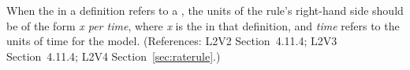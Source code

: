 When the  in a \RateRule definition refers to a \Parameter,
the units of the rule's right-hand side should be of the form \emph{x per
time}, where \emph{x} is the  in that \Parameter definition,
and \emph{time} refers to the units of time for the model.  (References:
L2V2 Section~4.11.4; L2V3 Section~4.11.4; L2V4 Section~\ref{sec:raterule}.)
